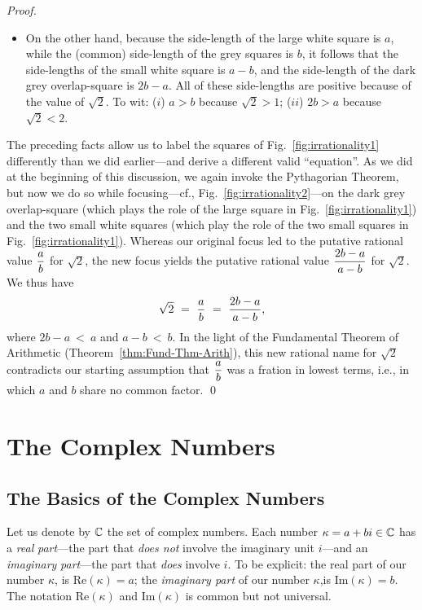 \begin{proof}
\begin{itemize}
\item
On the other hand, because the side-length of the large white square
is $a$, while the (common) side-length of the grey squares is $b$, it
follows that the side-lengths of the small white square is $a-b$, and
the side-length of the dark grey overlap-square is $2b-a$.  All of
these side-lengths are positive because of the value of $\sqrt{2}$.
To wit: ($i$) $a > b$ because $\sqrt{2} >1$; ($ii$) $2b >a$ because
$\sqrt{2} < 2$.
\end{itemize}
The preceding facts allow us to label the squares of
Fig.~\ref{fig:irrationality1} differently than we did earlier---and
derive a different valid ``equation''.  As we did at the beginning of
this discussion, we again invoke the Pythagorian Theorem, but now we
do so while focusing---cf., Fig.~\ref{fig:irrationality2}---on the
dark grey overlap-square (which plays the role of the large square in
Fig.~\ref{fig:irrationality1}) and the two small white squares (which
play the role of the two small squares in
Fig.~\ref{fig:irrationality1}).  Whereas our original focus led to the
putative rational value $\displaystyle {a \over b}$ for $\sqrt{2}$,
the new focus yields the putative rational value $\displaystyle {2b-a
  \over a-b}$ for $\sqrt{2}$.  We thus have
\[ \sqrt{2} \ = \ {a \over b} \ = \ {2b-a \over a-b}, \]
where $2b-a \ < \ a$ and $a-b \ < \ b$.  In the light of the
Fundamental Theorem of Arithmetic (Theorem~\ref{thm:Fund-Thm-Arith}),
this new rational name for $\sqrt{2}$ contradicts our starting
assumption that $\displaystyle {a \over b}$ was a fration in lowest
terms, i.e., in which $a$ and $b$ share no common factor. %
\qed
\end{proof}



\section{The Complex Numbers}
\label{sec:complexes}

\subsection{The Basics of the Complex Numbers}

Let us denote by $\mathbb{C}$ the set of complex numbers.  Each number $\kappa
= a+bi \in \mathbb{C}$ has a {\it real}  {\em
  part}---the part that {\em does not} involve the imaginary unit
 $i$---and an {\it imaginary}
 {\em part}---the part that {\em
  does} involve $i$.  To be explicit: the real part of our number
$\kappa$, is  Re$(\kappa)
= a$; the {\it imaginary part} of our number $\kappa$,is
 Im$(\kappa) = b$.
 The notation
Re$(\kappa)$ and Im$(\kappa)$ is common but not universal.

